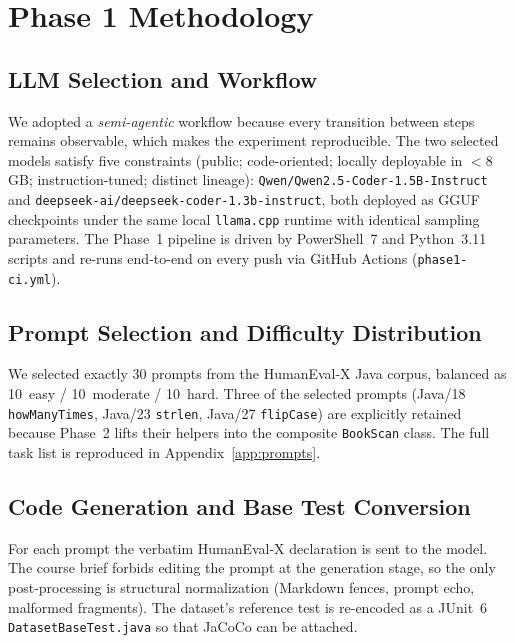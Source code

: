 \documentclass[journal]{IEEEtran}
\begin{document}
\section{Phase 1 Methodology}\label{sec:phase1-method}

\subsection{LLM Selection and Workflow}

We adopted a \emph{semi-agentic} workflow because every transition between
steps remains observable, which makes the experiment reproducible. The
two selected models satisfy five constraints (public; code-oriented;
locally deployable in $<$8\,GB; instruction-tuned; distinct lineage):
\texttt{Qwen/Qwen2.5-Coder-1.5B-Instruct} and
\texttt{deepseek-ai/deepseek-coder-1.3b-instruct}, both deployed as GGUF
checkpoints under the same local \texttt{llama.cpp} runtime with identical
sampling parameters. The Phase~1 pipeline is driven by PowerShell~7 and
Python~3.11 scripts and re-runs end-to-end on every push via GitHub
Actions (\texttt{phase1-ci.yml}).

\subsection{Prompt Selection and Difficulty Distribution}

We selected exactly 30 prompts from the HumanEval-X Java corpus, balanced
as 10~easy / 10~moderate / 10~hard. Three of the selected prompts
(Java/18 \texttt{howManyTimes}, Java/23 \texttt{strlen}, Java/27
\texttt{flipCase}) are explicitly retained because Phase~2 lifts their
helpers into the composite \texttt{BookScan} class. The full task list is
reproduced in Appendix~\ref{app:prompts}.

\subsection{Code Generation and Base Test Conversion}

For each prompt the verbatim HumanEval-X declaration is sent to the
model. The course brief forbids editing the prompt at the generation
stage, so the only post-processing is structural normalization (Markdown
fences, prompt echo, malformed fragments). The dataset's reference test
is re-encoded as a JUnit~6 \texttt{DatasetBaseTest.java} so that JaCoCo
can be attached.
\end{document}
